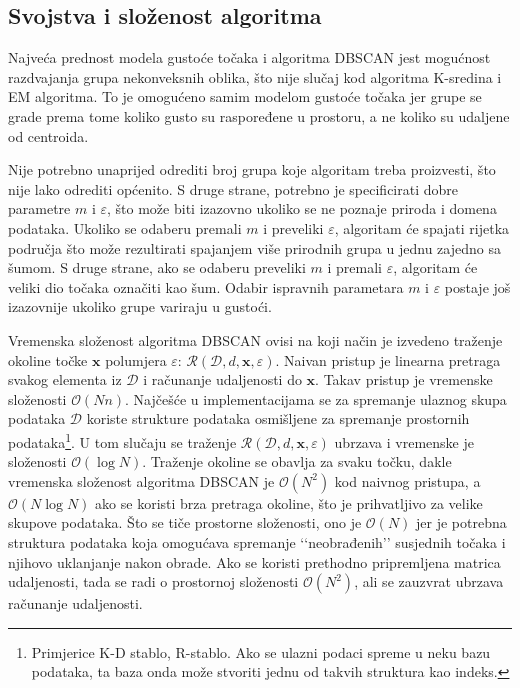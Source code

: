 \documentclass[times, utf8, zavrsni]{fer}
\begin{document}
\subsection{Svojstva i složenost algoritma}
Najveća prednost modela gustoće točaka i algoritma DBSCAN jest mogućnost razdvajanja grupa nekonveksnih oblika, što nije slučaj kod algoritma K-sredina i EM algoritma. To je omogućeno samim modelom gustoće točaka jer grupe se grade prema tome koliko gusto su raspoređene u prostoru, a ne koliko su udaljene od centroida.

Nije potrebno unaprijed odrediti broj grupa koje algoritam treba proizvesti, što nije lako odrediti općenito. S druge strane, potrebno je specificirati dobre parametre $m$ i $\varepsilon$, što može biti izazovno ukoliko se ne poznaje priroda i domena podataka. Ukoliko se odaberu premali $m$ i preveliki $\varepsilon$, algoritam će spajati rijetka područja što može rezultirati spajanjem više prirodnih grupa u jednu zajedno sa šumom. S druge strane, ako se odaberu preveliki $m$ i premali $\varepsilon$, algoritam će veliki dio točaka označiti kao šum. Odabir ispravnih parametara $m$ i $\varepsilon$ postaje još izazovnije ukoliko grupe variraju u gustoći.

Vremenska složenost algoritma DBSCAN ovisi na koji način je izvedeno traženje okoline točke $\mathbf{x}$ polumjera $\varepsilon$: $\mathcal{R} \left(\mathcal{D}, d, \mathbf{x}, \varepsilon\right)$. Naivan pristup je linearna pretraga svakog elementa iz $\mathcal{D}$ i računanje udaljenosti do $\mathbf{x}$. Takav pristup je vremenske složenosti $\mathcal{O} \left(N n\right)$. Najčešće u implementacijama se za spremanje ulaznog skupa podataka $\mathcal{D}$ koriste strukture podataka osmišljene za spremanje prostornih podataka\footnote{Primjerice K-D stablo, R-stablo. Ako se ulazni podaci spreme u neku bazu podataka, ta baza onda može stvoriti jednu od takvih struktura kao indeks.}. U tom slučaju se traženje $\mathcal{R} \left(\mathcal{D}, d, \mathbf{x}, \varepsilon\right)$ ubrzava i vremenske je složenosti $\mathcal{O} \left(\log{N}\right)$. Traženje okoline se obavlja za svaku točku, dakle vremenska složenost algoritma DBSCAN je $\mathcal{O} \left(N^2\right)$ kod naivnog pristupa, a $\mathcal{O} \left(N \log{N}\right)$ ako se koristi brza pretraga okoline, što je prihvatljivo za velike skupove podataka. Što se tiče prostorne složenosti, ono je $\mathcal{O} \left(N\right)$ jer je potrebna struktura podataka koja omogućava spremanje ‘‘neobrađenih’’ susjednih točaka i njihovo uklanjanje nakon obrade. Ako se koristi prethodno pripremljena matrica udaljenosti, tada se radi o prostornoj složenosti $\mathcal{O} \left(N^2\right)$, ali se zauzvrat ubrzava računanje udaljenosti.
\end{document}
